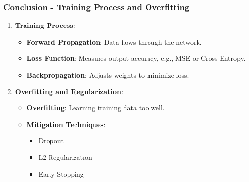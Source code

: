 \documentclass[aspectratio=169]{beamer}
\begin{document}
\begin{frame}[fragile]
    \frametitle{Conclusion - Training Process and Overfitting}
    \begin{enumerate}[resume]
        \item \textbf{Training Process}:
        \begin{itemize}
            \item \textbf{Forward Propagation}: Data flows through the network.
            \item \textbf{Loss Function}: Measures output accuracy, e.g., MSE or Cross-Entropy.
            \item \textbf{Backpropagation}: Adjusts weights to minimize loss.
        \end{itemize}

        \item \textbf{Overfitting and Regularization}:
        \begin{itemize}
            \item \textbf{Overfitting}: Learning training data too well.
            \item \textbf{Mitigation Techniques}:
            \begin{itemize}
                \item Dropout
                \item L2 Regularization
                \item Early Stopping
            \end{itemize}
        \end{itemize}
    \end{enumerate}
\end{frame}
\end{document}
